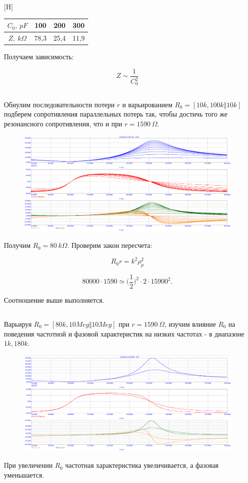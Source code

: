 \documentclass{article}
\begin{document}
\begin{center}[H]
\begin{tabular}{|c|c|c|c|}
\hline 
$C_0, \: pF$ & 100 & 200 & 300 \\ 
\hline 
$Z, \: k\Omega$ & 78,3 & 25,4 & 11,9 \\ 
\hline 
\end{tabular} 
\end{center}

Получаем зависимость:

\[Z \sim \frac{1}{C_0^2}\]

\subsection{}
Обнулим последовательности потери $r$ и варьированием $R_0 = [10k, 100k \Vert 10k]$ подберем сопротивления параллельных потерь так, чтобы достичь того же резонансного сопротивления, что и при $r = 1590 \: \Omega$.

\begin{figure}[H]
\centering
\includegraphics[scale=0.4]{combined_AC4.png}
\label{fig:Image1}
\end{figure}

Получим $R_0 = 80 \: k\Omega$. Проверим закон пересчета:

\[R_0 r = k^2 \rho_p^2\]

\[80000 \cdot 1590 \simeq \Big(\frac{1}{2}\Big)^2 \cdot 2 \cdot 15900^2.\]

Соотношение выше выполняется.

\subsection{}
Варьируя $R_0 = [80k, 10Meg \Vert 10Meg]$ при $r = 1590 \: \Omega$, изучим влияние $R_0$ на поведения частотной и фазовой характеристик на низких частотах - в диапазоне $1k, 180k$.

\begin{figure}[H]
\centering
\includegraphics[scale=0.4]{combined_AC5.png}
\label{fig:Image1}
\end{figure}

При увеличении $R_0$ частотная характеристика увеличивается, а фазовая уменьшается.
\end{document}
